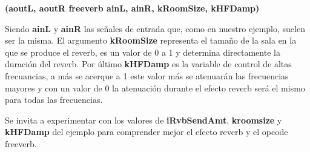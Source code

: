 \textbf{(aoutL, aoutR freeverb ainL, ainR, kRoomSize, kHFDamp)}

Siendo \textbf{ainL} y \textbf{ainR} las señales de entrada que, como en nuestro ejemplo, suelen ser la misma. El argumento \textbf{kRoomSize} representa el tamaño de la sala en la que se produce el reverb, es un valor de 0 a 1 y determina directamente la duración del reverb. Por último \textbf{kHFDamp} es la variable de control de altas frecuancias, a más se acerque a 1 este valor más se atenuarán las frecuencias mayores y con un valor de 0 la atenuación durante el efecto reverb será el mismo para todas las frecuencias.

Se invita a experimentar con los valores de \textbf{iRvbSendAmt}, \textbf{kroomsize} y \textbf{kHFDamp} del ejemplo para comprender mejor el efecto reverb y el opcode freeverb.